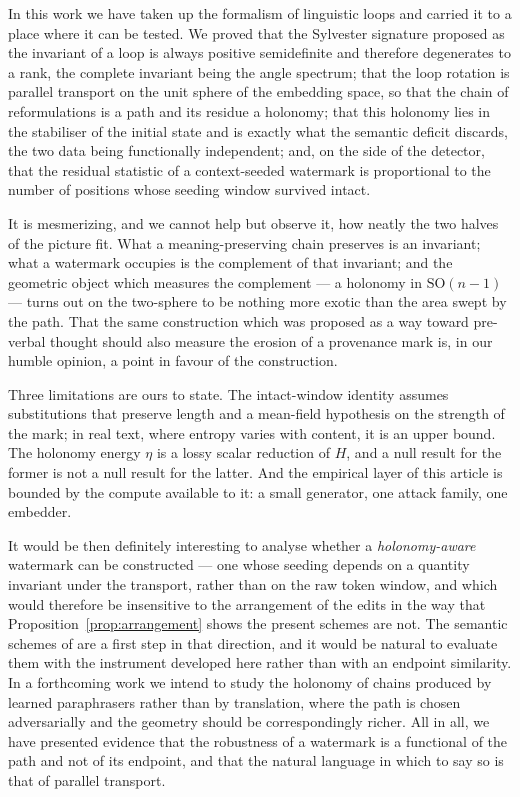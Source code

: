 \documentclass[11pt,a4paper]{article}
\theoremstyle{plain}
\theoremstyle{definition}
\numberwithin{equation}{section}
\newcommand{\SO}{\mathrm{SO}}
\begin{document}
In this work we have taken up the formalism of linguistic loops and
carried it to a place where it can be tested. We proved that the
Sylvester signature proposed as the invariant of a loop is always
positive semidefinite and therefore degenerates to a rank, the complete
invariant being the angle spectrum; that the loop rotation is parallel
transport on the unit sphere of the embedding space, so that the chain
of reformulations is a path and its residue a holonomy; that this
holonomy lies in the stabiliser of the initial state and is exactly what
the semantic deficit discards, the two data being functionally
independent; and, on the side of the detector, that the residual
statistic of a context-seeded watermark is proportional to the number of
positions whose seeding window survived intact.

It is mesmerizing, and we cannot help but observe it, how neatly the two
halves of the picture fit. What a meaning-preserving chain preserves is
an invariant; what a watermark occupies is the complement of that
invariant; and the geometric object which measures the complement --- a
holonomy in $\SO(n-1)$ --- turns out on the two-sphere to be nothing
more exotic than the area swept by the path. That the same construction
which was proposed as a way toward pre-verbal thought should also
measure the erosion of a provenance mark is, in our humble opinion, a
point in favour of the construction.

Three limitations are ours to state. The intact-window identity assumes
substitutions that preserve length and a mean-field hypothesis on the
strength of the mark; in real text, where entropy varies with content,
it is an upper bound. The holonomy energy $\eta$ is a lossy scalar
reduction of $H$, and a null result for the former is not a null result
for the latter. And the empirical layer of this article is bounded by
the compute available to it: a small generator, one attack family,
one embedder.

It would be then definitely interesting to analyse whether a
\emph{holonomy-aware} watermark can be constructed --- one whose seeding
depends on a quantity invariant under the transport, rather than on the
raw token window, and which would therefore be insensitive to the
arrangement of the edits in the way that Proposition~\ref{prop:arrangement}
shows the present schemes are not. The semantic schemes of
\cite{Hou24a} are a first step in that direction, and it would be
natural to evaluate them with the instrument developed here rather than
with an endpoint similarity. In a forthcoming work we intend to study
the holonomy of chains produced by learned paraphrasers rather than by
translation, where the path is chosen adversarially and the geometry
should be correspondingly richer. All in all, we have presented evidence
that the robustness of a watermark is a functional of the path and not
of its endpoint, and that the natural language in which to say so is
that of parallel transport.
\end{document}
